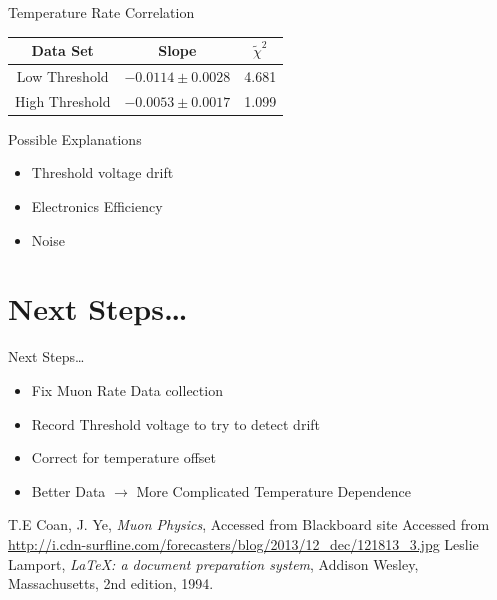 \documentclass{beamer}
\begin{document}
\begin{frame}{Temperature Rate Correlation}
\begin{center}
	\begin{tabular}{|c|c|c|}\hline
		Data Set & Slope & $\tilde{\chi}^2$ \\ \hline\hline
		Low Threshold& $-0.0114 \pm 0.0028 $ & 4.681  \\ \hline
		High Threshold &$-0.0053 \pm 0.0017 $ & 1.099\\ \hline
	\end{tabular}
\end{center}
\end{frame}


\begin{frame}{Possible Explanations}
	\begin{itemize}
	\item Threshold voltage drift
	\item Electronics Efficiency
	\item Noise
	\end{itemize}
\end{frame}


\section{Next Steps\dots{}}

\begin{frame}{Next Steps\dots{}}

\begin{itemize}
\item Fix Muon Rate Data collection
\item Record Threshold voltage to try to detect drift
\item Correct for temperature offset
\item Better Data $\to$ More Complicated Temperature Dependence
\end{itemize}


\end{frame}
\begin{frame}
\begin{thebibliography}{9}
	T.E Coan, J. Ye,
	\emph{Muon Physics},
	Accessed from Blackboard site
	Accessed from \url{http://i.cdn-surfline.com/forecasters/blog/2013/12_dec/121813_3.jpg}
  Leslie Lamport,
  \emph{\LaTeX: a document preparation system},
  Addison Wesley, Massachusetts,
  2nd edition,
  1994.

\end{thebibliography}
\end{frame}
\end{document}
